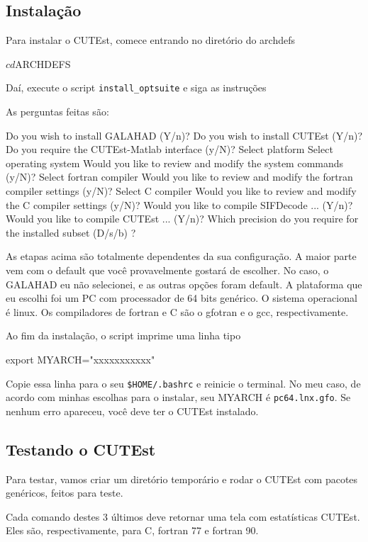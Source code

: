 \subsection{Instalação}
Para instalar o CUTEst, comece entrando no diretório do archdefs
\begin{terminal}
$ cd $ARCHDEFS
\end{terminal}
Daí, execute o script \verb+install_optsuite+ e siga as instruções
As perguntas feitas são:
\begin{terminal}
Do you wish to install GALAHAD (Y/n)?
Do you wish to install CUTEst (Y/n)?
Do you require the CUTEst-Matlab interface (y/N)?
Select platform
Select operating system
Would you like to review and modify the system commands (y/N)?
Select fortran compiler
Would you like to review and modify the fortran compiler settings (y/N)?
Select C compiler
Would you like to review and modify the C compiler settings (y/N)?
Would you like to compile SIFDecode ... (Y/n)?
Would you like to compile CUTEst ... (Y/n)?
Which precision do you require for the installed subset (D/s/b) ?
\end{terminal}
As etapas acima são totalmente dependentes da sua configuração. A maior parte
vem com o default que você provavelmente gostará de escolher. No caso, o
GALAHAD eu não selecionei, e as outras opções foram default. A plataforma que
eu escolhi foi um PC com processador de 64 bits genérico. O sistema operacional
é linux. Os compiladores de fortran e C são o gfotran e o gcc, respectivamente.

Ao fim da instalação, o script imprime uma linha tipo
\begin{terminal}
export MYARCH="xxxxxxxxxxx"
\end{terminal}
Copie essa linha para o seu \verb+$HOME/.bashrc+ e reinicie o terminal. 
No meu caso, de acordo com
minhas escolhas para o instalar, seu MYARCH é \verb+pc64.lnx.gfo+.
Se nenhum erro apareceu, você deve ter o CUTEst instalado.

\subsection{Testando o CUTEst}

Para testar, vamos criar um diretório temporário e rodar o CUTEst com pacotes
genéricos, feitos para teste.
Cada comando destes 3 últimos deve retornar uma tela com estatísticas CUTEst.
Eles são, respectivamente, para C, fortran 77 e fortran 90.
